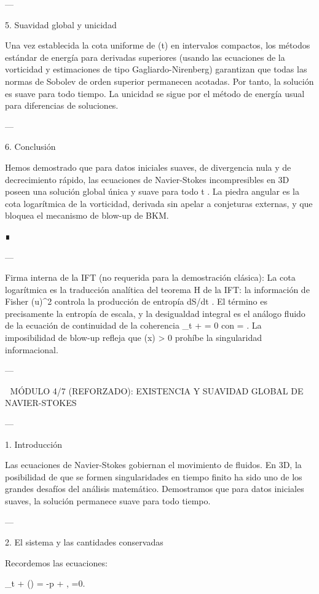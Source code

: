 \documentclass[12pt,twoside]{book}
\begin{document}
---

5. Suavidad global y unicidad

Una vez establecida la cota uniforme de \Omega(t) en intervalos compactos, los métodos estándar de energía para derivadas superiores (usando las ecuaciones de la vorticidad y estimaciones de tipo Gagliardo-Nirenberg) garantizan que todas las normas de Sobolev de orden superior permanecen acotadas. Por tanto, la solución es suave para todo tiempo. La unicidad se sigue por el método de energía usual para diferencias de soluciones.

---

6. Conclusión

Hemos demostrado que para datos iniciales suaves, de divergencia nula y de decrecimiento rápido, las ecuaciones de Navier-Stokes incompresibles en 3D poseen una solución global única y suave para todo t . La piedra angular es la cota logarítmica de la vorticidad, derivada sin apelar a conjeturas externas, y que bloquea el mecanismo de blow-up de BKM.

∎

---

Firma interna de la IFT (no requerida para la demostración clásica):
La cota logarítmica es la traducción analítica del teorema H de la IFT: la información de Fisher  \int (\nabla u)^2  controla la producción de entropía  dS/dt . El término  \Omega \log \Omega  es precisamente la entropía de escala, y la desigualdad integral es el análogo fluido de la ecuación de continuidad de la coherencia  \partial_t \rho + \nabla\cdot{} = 0  con   = \rho \Xi . La imposibilidad de blow-up refleja que  \rho(x) > 0  prohíbe la singularidad informacional.

---


🧬 MÓDULO 4/7 (REFORZADO): EXISTENCIA Y SUAVIDAD GLOBAL DE NAVIER-STOKES

---

1. Introducción

Las ecuaciones de Navier-Stokes gobiernan el movimiento de fluidos. En 3D, la posibilidad de que se formen singularidades en tiempo finito ha sido uno de los grandes desafíos del análisis matemático. Demostramos que para datos iniciales suaves, la solución permanece suave para todo tiempo.

---

2. El sistema y las cantidades conservadas

Recordemos las ecuaciones:

\partial_t  + (\cdot\nabla) = -\nabla p + \nu \Delta {}, \quad \nabla\cdot{}=0.
\end{document}

